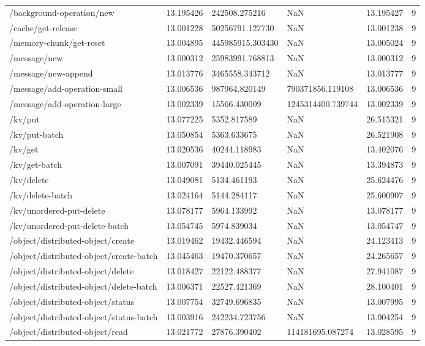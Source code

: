 \begin{tabularx}{\linewidth}{XXXXXX}
/background-operation/new & 13.195426 & 242508.275216 & NaN & 13.195427 & 9 \\
/cache/get-release & 13.001228 & 50256791.127730 & NaN & 13.001238 & 9 \\
/memory-chunk/get-reset & 13.004895 & 445985915.303430 & NaN & 13.005024 & 9 \\
/message/new & 13.000312 & 25983991.768813 & NaN & 13.000312 & 9 \\
/message/new-append & 13.013776 & 3465558.343712 & NaN & 13.013777 & 9 \\
/message/add-operation-small & 13.006536 & 987964.820149 & 790371856.119108 & 13.006536 & 9 \\
/message/add-operation-large & 13.002339 & 15566.430009 & 1245314400.739744 & 13.002339 & 9 \\
/kv/put & 13.077225 & 5352.817589 & NaN & 26.515321 & 9 \\
/kv/put-batch & 13.050854 & 5363.633675 & NaN & 26.521908 & 9 \\
/kv/get & 13.020536 & 40244.118983 & NaN & 13.402076 & 9 \\
/kv/get-batch & 13.007091 & 39440.025445 & NaN & 13.394873 & 9 \\
/kv/delete & 13.049081 & 5134.461193 & NaN & 25.624476 & 9 \\
/kv/delete-batch & 13.024164 & 5144.284117 & NaN & 25.600907 & 9 \\
/kv/unordered-put-delete & 13.078177 & 5964.133992 & NaN & 13.078177 & 9 \\
/kv/unordered-put-delete-batch & 13.054745 & 5974.839034 & NaN & 13.054747 & 9 \\
/object/distributed-object/create & 13.019462 & 19432.446594 & NaN & 24.123413 & 9 \\
/object/distributed-object/create-batch & 13.045463 & 19470.370657 & NaN & 24.265657 & 9 \\
/object/distributed-object/delete & 13.018427 & 22122.488377 & NaN & 27.941087 & 9 \\
/object/distributed-object/delete-batch & 13.006371 & 22527.421369 & NaN & 28.100401 & 9 \\
/object/distributed-object/status & 13.007754 & 32749.696835 & NaN & 13.007995 & 9 \\
/object/distributed-object/status-batch & 13.003916 & 242234.723756 & NaN & 13.004254 & 9 \\
/object/distributed-object/read & 13.021772 & 27876.390402 & 114181695.087274 & 13.028595 & 9 \\

\end{tabularx}
